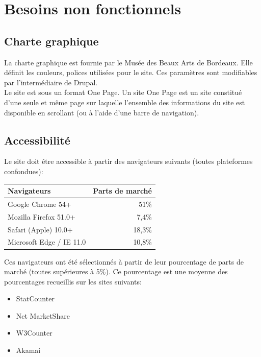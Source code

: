 \documentclass[11pt]{report}
\begin{document}

\section{Besoins non fonctionnels}

\subsection*{Charte graphique}

La charte graphique est fournie par le Musée des Beaux Arts de Bordeaux. Elle définit
les couleurs, polices utilisées pour le site. Ces paramètres sont modifiables par
l'intermédiaire de Drupal. \\
Le site est sous un format One Page. Un site One Page est un site constitué
d'une seule et même page sur laquelle l'ensemble des informations du site
est disponible en scrollant (ou à l'aide d'une barre de navigation).

\subsection*{Accessibilité}

Le site doit être accessible à partir des navigateurs suivants (toutes plateformes confondues):
\begin{center}
	\begin{tabular}{|l | r|}
		\hline
		Navigateurs & Parts de marché \\
		\hline
		\hline
		Google Chrome 54+ & 51\% \\
		\hline
		Mozilla Firefox 51.0+ & 7,4\% \\
		\hline
		Safari (Apple) 10.0+ & 18,3\% \\
		\hline
		Microsoft Edge / IE 11.0 & 10,8\% \\
		\hline
	\end{tabular}
\end{center}
Ces navigateurs ont été sélectionnés à partir de leur pourcentage de parts de
marché (toutes supérieures à 5\%). Ce pourcentage est une moyenne des pourcentages
recueillis sur les sites suivants:
\begin{itemize}
	\item StatCounter
	\item Net MarketShare
	\item W3Counter
	\item Akamai
\end{itemize}
\end{document}
